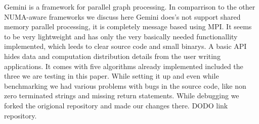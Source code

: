 
Gemini\cite{Gemini} is a framework for parallel graph processing. In comparrison to the other NUMA-aware frameworks we discuss here Gemini does's not support shared memory parallel processing, it is completely message based using MPI. It seems to be very lightweight and has only the very basically needed functionallity implemented, which leeds to clear source code and small binarys. A basic API hides data and computation distribution details from the user writing applications. It comes with five algorithms already implemented included the three we are testing in this paper. While setting it up and even while benchmarking we had various problems with bugs in the source code, like non zero terminated strings and missing return statements. While debugging we forked the origional repository and made our changes there. DODO link repository.
